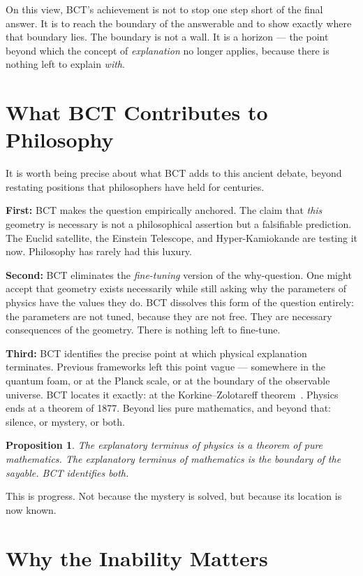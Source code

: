 \documentclass[aps,prl,twocolumn,superscriptaddress,floatfix]{revtex4-2}
\newtheorem{proposition}{Proposition}
\begin{document}
On this view, BCT's achievement is not to stop one step short of the 
final answer. It is to reach the boundary of the answerable and to 
show exactly where that boundary lies. The boundary is not a wall. 
It is a horizon --- the point beyond which the concept of 
\emph{explanation} no longer applies, because there is nothing 
left to explain \emph{with}.

\section{What BCT Contributes to Philosophy}

It is worth being precise about what BCT adds to this ancient debate, 
beyond restating positions that philosophers have held for centuries.

\textbf{First:} BCT makes the question empirically anchored. The 
claim that \emph{this} geometry is necessary is not a philosophical 
assertion but a falsifiable prediction. The Euclid satellite, the 
Einstein Telescope, and Hyper-Kamiokande are testing it now. 
Philosophy has rarely had this luxury.

\textbf{Second:} BCT eliminates the \emph{fine-tuning} version of 
the why-question. One might accept that geometry exists necessarily 
while still asking why the parameters of physics have the values 
they do. BCT dissolves this form of the question entirely: the 
parameters are not tuned, because they are not free. They are 
necessary consequences of the geometry. There is nothing left to 
fine-tune.

\textbf{Third:} BCT identifies the precise point at which physical 
explanation terminates. Previous frameworks left this point vague --- 
somewhere in the quantum foam, or at the Planck scale, or at the 
boundary of the observable universe. BCT locates it exactly: at 
the Korkine--Zolotareff theorem~\cite{korkine}. Physics ends at a 
theorem of 1877. Beyond lies pure mathematics, and beyond that: 
silence, or mystery, or both.

\begin{proposition}
The explanatory terminus of physics is a theorem of pure mathematics. 
The explanatory terminus of mathematics is the boundary of the 
sayable. BCT identifies both.
\end{proposition}

This is progress. Not because the mystery is solved, but because 
its location is now known.

\section{Why the Inability Matters}
\end{document}
